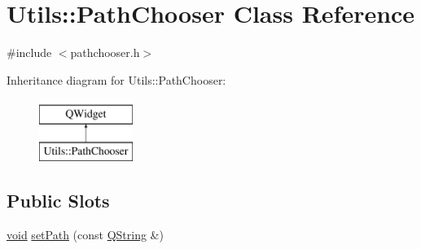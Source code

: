 \hypertarget{class_utils_1_1_path_chooser}{\section{Utils\-:\-:Path\-Chooser Class Reference}
\label{class_utils_1_1_path_chooser}
}


{\ttfamily \#include $<$pathchooser.\-h$>$}

Inheritance diagram for Utils\-:\-:Path\-Chooser\-:\begin{figure}[H]
\begin{center}
\leavevmode
\includegraphics[height=2.000000cm]{class_utils_1_1_path_chooser}
\end{center}
\end{figure}
\subsection*{Public Slots}
\begin{DoxyCompactItemize}
\item 
\hyperlink{group___u_a_v_objects_plugin_ga444cf2ff3f0ecbe028adce838d373f5c}{void} \hyperlink{class_utils_1_1_path_chooser_a203c904fd86a0b7826b83b54bf711a53}{set\-Path} (const \hyperlink{group___u_a_v_objects_plugin_gab9d252f49c333c94a72f97ce3105a32d}{Q\-String} \&)
\end{DoxyCompactItemize}
